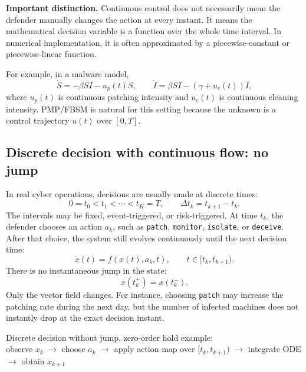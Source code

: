 \documentclass[11pt,a4paper]{article}
\begin{document}
\begin{boxednote}
\textbf{Important distinction.}
Continuous control does not necessarily mean the defender manually changes the action at every instant. It means the mathematical decision variable is a function over the whole time interval. In numerical implementation, it is often approximated by a piecewise-constant or piecewise-linear function.
\end{boxednote}

For example, in a malware model,
\begin{equation}
\dot{S}=-\beta SI-u_p(t)S,\qquad
\dot{I}=\beta SI-(\gamma+u_c(t))I,
\end{equation}
where $u_p(t)$ is continuous patching intensity and $u_c(t)$ is continuous cleaning intensity. PMP/FBSM is natural for this setting because the unknown is a control trajectory $u(t)$ over $[0,T]$.

\subsection{Discrete decision with continuous flow: no jump}
In real cyber operations, decisions are usually made at discrete times:
\begin{equation}
    0=t_0<t_1<\cdots<t_K=T,\qquad \Delta t_k=t_{k+1}-t_k.
\end{equation}
The intervals may be fixed, event-triggered, or risk-triggered. At time $t_k$, the defender chooses an action $a_k$, such as \texttt{patch}, \texttt{monitor}, \texttt{isolate}, or \texttt{deceive}. After that choice, the system still evolves continuously until the next decision time:
\begin{equation}
    \dot{x}(t)=f(x(t),a_k,t),\qquad t\in[t_k,t_{k+1}).
\end{equation}
There is no instantaneous jump in the state:
\begin{equation}
    x(t_k^+)=x(t_k^-).
\end{equation}
Only the vector field changes. For instance, choosing \texttt{patch} may increase the patching rate during the next day, but the number of infected machines does not instantly drop at the exact decision instant.

\begin{flowbox}
Discrete decision without jump, zero-order hold example:\\[0.3em]
observe $x_k$ $\rightarrow$ choose $a_k$ $\rightarrow$ apply action map over $[t_k,t_{k+1})$ $\rightarrow$ integrate ODE $\rightarrow$ obtain $x_{k+1}$
\end{flowbox}
\end{document}
